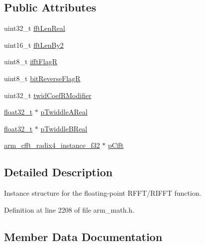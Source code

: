 \subsection*{Public Attributes}
\begin{DoxyCompactItemize}
\item 
uint32\+\_\+t \hyperlink{structarm__rfft__instance__f32_a4219d4669699e4efdcb150ed7a0d9a57}{fft\+Len\+Real}
\item 
uint16\+\_\+t \hyperlink{structarm__rfft__instance__f32_a075076e07ebb8521d8e3b49a31db6c57}{fft\+Len\+By2}
\item 
uint8\+\_\+t \hyperlink{structarm__rfft__instance__f32_a5ee6d10a934ab4b666e0bb286c3d633f}{ifft\+FlagR}
\item 
uint8\+\_\+t \hyperlink{structarm__rfft__instance__f32_ac342f3248157cbbd2f04a3c8ec9fc9eb}{bit\+Reverse\+FlagR}
\item 
uint32\+\_\+t \hyperlink{structarm__rfft__instance__f32_aede85350fb5ae6baa1b3e8bfa15b18d6}{twid\+Coef\+R\+Modifier}
\item 
\hyperlink{arm__math_8h_a4611b605e45ab401f02cab15c5e38715}{float32\+\_\+t} $\ast$ \hyperlink{structarm__rfft__instance__f32_a534cc7e6e9b3e3dd022fad611c762142}{p\+Twiddle\+A\+Real}
\item 
\hyperlink{arm__math_8h_a4611b605e45ab401f02cab15c5e38715}{float32\+\_\+t} $\ast$ \hyperlink{structarm__rfft__instance__f32_a23543ecfd027fea2477fe1eea23c3c4d}{p\+Twiddle\+B\+Real}
\item 
\hyperlink{structarm__cfft__radix4__instance__f32}{arm\+\_\+cfft\+\_\+radix4\+\_\+instance\+\_\+f32} $\ast$ \hyperlink{structarm__rfft__instance__f32_a9f47ba9f50c81e4445ae3827b981bc05}{p\+Cfft}
\end{DoxyCompactItemize}


\subsection{Detailed Description}
Instance structure for the floating-\/point R\+F\+F\+T/\+R\+I\+F\+FT function. 

Definition at line 2208 of file arm\+\_\+math.\+h.



\subsection{Member Data Documentation}
\mbox{\label{structarm__rfft__instance__f32_ac342f3248157cbbd2f04a3c8ec9fc9eb}} 
